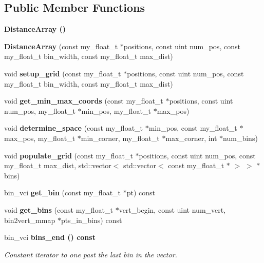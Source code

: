\subsection*{Public Member Functions}
\begin{CompactItemize}
\item 
\bf{Distance\-Array} ()
\item 
\textbf{Distance\-Array} (const my\_\-float\_\-t $\ast$positions, const uint num\_\-pos, const my\_\-float\_\-t bin\_\-width, const my\_\-float\_\-t max\_\-dist)\label{classSimSite3D_1_1geometry_1_1DistanceArray_3838bfe2441f1dd98f87689aea5cf16a}

\item 
void \textbf{setup\_\-grid} (const my\_\-float\_\-t $\ast$positions, const uint num\_\-pos, const my\_\-float\_\-t bin\_\-width, const my\_\-float\_\-t max\_\-dist)\label{classSimSite3D_1_1geometry_1_1DistanceArray_501f917f566d2ae25bb0649db73e7625}

\item 
void \textbf{get\_\-min\_\-max\_\-coords} (const my\_\-float\_\-t $\ast$positions, const uint num\_\-pos, my\_\-float\_\-t $\ast$min\_\-pos, my\_\-float\_\-t $\ast$max\_\-pos)\label{classSimSite3D_1_1geometry_1_1DistanceArray_43c86d0510bafc7dc0cac5b2cba570a7}

\item 
void \textbf{determine\_\-space} (const my\_\-float\_\-t $\ast$min\_\-pos, const my\_\-float\_\-t $\ast$max\_\-pos, my\_\-float\_\-t $\ast$min\_\-corner, my\_\-float\_\-t $\ast$max\_\-corner, int $\ast$num\_\-bins)\label{classSimSite3D_1_1geometry_1_1DistanceArray_a4cc0a8c9a2b2474b11a3b0ed4c5bedd}

\item 
void \textbf{populate\_\-grid} (const my\_\-float\_\-t $\ast$positions, const uint num\_\-pos, const my\_\-float\_\-t max\_\-dist, std::vector$<$ std::vector$<$ const my\_\-float\_\-t $\ast$ $>$ $>$ $\ast$bins)\label{classSimSite3D_1_1geometry_1_1DistanceArray_4c9b723809adef008c0b4ca51774f726}

\item 
bin\_\-vci \textbf{get\_\-bin} (const my\_\-float\_\-t $\ast$pt) const \label{classSimSite3D_1_1geometry_1_1DistanceArray_98eb2f3e69db33ab79650d39da540ebf}

\item 
void \textbf{get\_\-bins} (const my\_\-float\_\-t $\ast$vert\_\-begin, const uint num\_\-vert, bin2vert\_\-mmap $\ast$pts\_\-in\_\-bins) const \label{classSimSite3D_1_1geometry_1_1DistanceArray_d78373acb3f5018b62772ecb9668c20f}

\item 
bin\_\-vci \bf{bins\_\-end} () const \label{classSimSite3D_1_1geometry_1_1DistanceArray_c287afc60a8d74ad4123b0e6a8f54eea}

\begin{CompactList}\small\item\em Constant iterator to one past the last bin in the vector. \item\end{CompactList}\end{CompactItemize}
